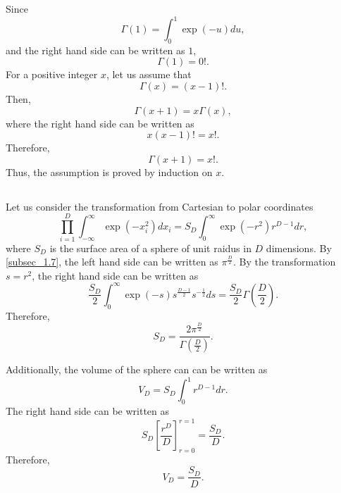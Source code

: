 Since
%
\begin{equation}
\Gamma(1) = \int_{0}^{1} \exp(- u) du,
\end{equation}
%
and the right hand side can be written as $1$,
%
\begin{equation}
\Gamma(1) = 0!.
\end{equation}
%
For a positive integer $x$, let us assume that
%
\begin{equation}
\Gamma(x) = (x - 1)!.
\end{equation}
%
Then,
%
\begin{equation}
\Gamma(x + 1) = x \Gamma(x),
\end{equation}
%
where the right hand side can be written as
%
\begin{equation}
x (x - 1)! = x!.
\end{equation}
%
Therefore,
%
\begin{equation}
\Gamma(x + 1) = x!.
\end{equation}
%
Thus, the assumption is proved by induction on $x$.


\subsection{}
\label{subsec_1.18}
Let us consider the transformation from Cartesian to polar coordinates
%
\begin{equation}
\prod_{i = 1}^{D} \int_{- \infty}^{\infty} \exp \left( - x_i ^ 2 \right) dx_i = S_D \int_{0}^{\infty} \exp \left( - r ^ 2 \right) r ^ {D - 1} dr,
\end{equation}
%
where $S_D$ is the surface area of a sphere of unit raidus in $D$ dimensions. 
By \ref{subsec_1.7}, the left hand side can be written as $\pi ^ \frac{D}{2}$. By the transformation $s = r ^ 2$, the right hand side can be written as
%
\begin{equation}
\frac{S_D}{2} \int_0^\infty \exp(- s) s ^ \frac{D - 1}{2} s ^ {- \frac{1}{2}} ds = \frac{S_D}{2} \Gamma \left( \frac{D}{2} \right).
\end{equation}
%
Therefore,
%
\begin{equation}
S_D = \frac{2 \pi ^ \frac{D}{2}}{\Gamma \left( \frac{D}{2} \right)}.
\end{equation}
%

Additionally, the volume of the sphere can can be written as
%
\begin{equation}
V_D = S_D \int_{0}^{1} r^{D - 1} dr.
\end{equation}
%
The right hand side can be written as 
%
\begin{equation}
S_D \left[ \frac{r ^ D}{D} \right]_{r = 0}^{r = 1} = \frac{S_D}{D}.
\end{equation}
%
Therefore, 
%
\begin{equation}
V_D = \frac{S_D}{D}.
\end{equation}
%

